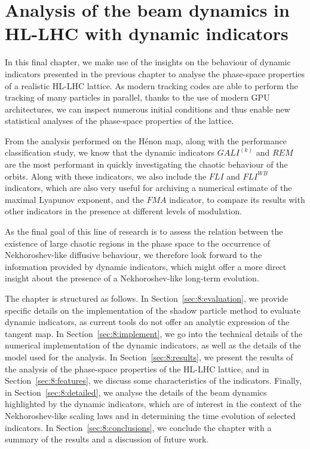 \chapter{Analysis of the beam dynamics in HL-LHC with dynamic indicators}\label{ch:dyn-lhc}

In this final chapter, we make use of the insights on the behaviour of dynamic indicators presented in the previous chapter to analyse the phase-space properties of a realistic HL-LHC lattice. As modern tracking codes are able to perform the tracking of many particles in parallel, thanks to the use of modern GPU architectures, we can inspect numerous initial conditions and thus enable new statistical analyses of the phase-space properties of the lattice.

From the analysis performed on the Hénon map, along with the performance classification study, we know that the dynamic indicators $GALI^{(k)}$ and $REM$ are the most performant in quickly investigating the chaotic behaviour of the orbits. Along with these indicators, we also include the $FLI$ and $FLI^{WB}$ indicators, which are also very useful for archiving a numerical estimate of the maximal Lyapunov exponent, and the $FMA$ indicator, to compare its results with other indicators in the presence at different levels of modulation.

As the final goal of this line of research is to assess the relation between the existence of large chaotic regions in the phase space to the occurrence of Nekhoroshev-like diffusive behaviour, we therefore look forward to the information provided by dynamic indicators, which might offer a more direct insight about the presence of a Nekhoroshev-like long-term evolution.

The chapter is structured as follows. In Section~\ref{sec:8:evaluation}, we provide specific details on the implementation of the shadow particle method to evaluate dynamic indicators, as current tools do not offer an analytic expression of the tangent map. In Section~\ref{sec:8:implement}, we go into the technical details of the numerical implementation of the dynamic indicators, as well as the details of the model used for the analysis. In Section~\ref{sec:8:results}, we present the results of the analysis of the phase-space properties of the HL-LHC lattice, and in Section~\ref{sec:8:features}, we discuss some characteristics of the indicators. Finally, in Section~\ref{sec:8:detailed}, we analyse the details of the beam dynamics highlighted by the dynamic indicators, which are of interest in the context of the Nekhoroshev-like scaling laws and in determining the time evolution of selected indicators. In Section~\ref{sec:8:conclusions}, we conclude the chapter with a summary of the results and a discussion of future work. 

